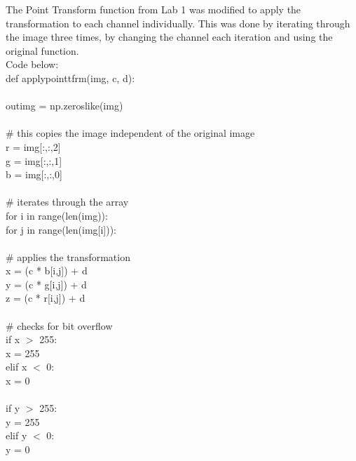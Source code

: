 \documentclass{article}
\begin{document}
	The Point Transform function from Lab 1 was modified to apply the transformation to each channel individually. This was done by iterating through the image three times, by changing the channel each iteration and using the original function.\\
	
	Code below:\\
	
	\noindent def apply\textunderscore point\textunderscore tfrm(img, c, d):\\
	\\
	\indent out\textunderscore img = np.zeros\textunderscore like(img)\\
	\\
	\indent \# this copies the image independent of the original image\\
	\indent r = img[:,:,2]\\
	\indent g = img[:,:,1]\\
	\indent b = img[:,:,0]\\
	\\
	\indent \# iterates through the array\\
	\indent for i in range(len(img)):\\
	\indent \indent for j in range(len(img[i])):\\
	\\
	\indent \indent \indent \# applies the transformation\\
	\indent \indent \indent x = (c * b[i,j]) + d\\
	\indent \indent \indent y = (c * g[i,j]) + d\\
	\indent \indent \indent z = (c * r[i,j]) + d\\
	\\
	\indent \indent \indent \# checks for bit overflow\\
	\indent \indent \indent if x $>$ 255:\\
	\indent \indent \indent \indent x = 255\\
	\indent \indent \indent elif x $<$ 0:\\
	\indent \indent \indent \indent x = 0\\
	\\
	\indent \indent \indent if y $>$ 255:\\
	\indent \indent \indent \indent y = 255\\
	\indent \indent \indent elif y $<$ 0:\\
	\indent \indent \indent \indent y = 0\\
	\\
\end{document}
